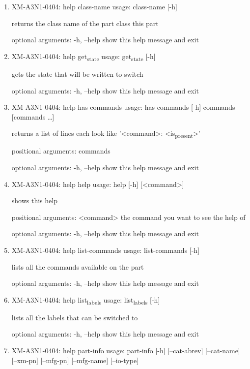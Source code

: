 \documentclass[11pt]{article}
\begin{document}
\begin{enumerate}
\item XM-A3N1-0404: help class-name
\label{sec:org3915ae1}
usage: class-name [-h]

returns the class name of the part class this part

optional arguments:
  -h, --help  show this help message and exit

\item XM-A3N1-0404: help get\textsubscript{state}
\label{sec:orga948ef5}
usage: get\textsubscript{state} [-h]

gets the state that will be written to switch

optional arguments:
  -h, --help  show this help message and exit

\item XM-A3N1-0404: help has-commands
\label{sec:orgd4fbc17}
usage: has-commands [-h] commands [commands \ldots{}]

returns a list of lines each look like '<command>: <is\textsubscript{present}>'

positional arguments:
  commands

optional arguments:
  -h, --help  show this help message and exit

\item XM-A3N1-0404: help help
\label{sec:org749a2b5}
usage: help [-h] [<command>]

shows this help

positional arguments:
  <command>   the command you want to see the help of

optional arguments:
  -h, --help  show this help message and exit

\item XM-A3N1-0404: help list-commands
\label{sec:org490d005}
usage: list-commands [-h]

lists all the commands available on the part

optional arguments:
  -h, --help  show this help message and exit

\item XM-A3N1-0404: help list\textsubscript{labels}
\label{sec:org3fb35ef}
usage: list\textsubscript{labels} [-h]

lists all the labels that can be switched to

optional arguments:
  -h, --help  show this help message and exit

\item XM-A3N1-0404: help part-info
\label{sec:org4892149}
usage: part-info  [-h] [--cat-abrev] [--cat-name] [--xm-pn] [--mfg-pn] [--mfg-name]
        [--io-type]


\end{enumerate}
\end{document}
